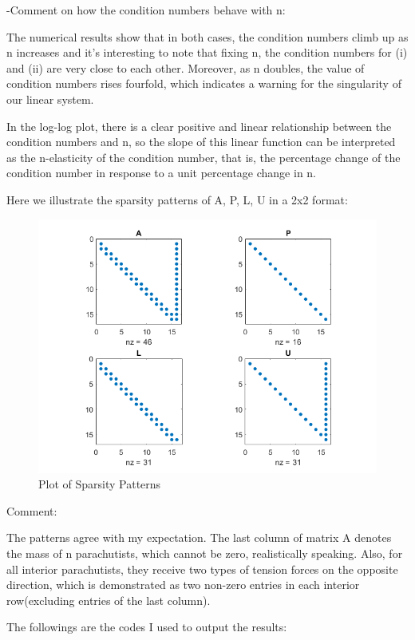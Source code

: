 \documentclass[12pt]{article}
\begin{document}
-Comment on how the condition numbers behave with n:

The numerical results show that in both cases, the condition numbers climb up as n increases and it's interesting to note that fixing n, the condition numbers for (i) and (ii) are very close to each other. Moreover, as n doubles, the value of condition numbers rises fourfold, which indicates a warning for the singularity of our linear system.

In the log-log plot, there is a clear positive and linear relationship between the condition numbers and n, so the slope of this linear function can be interpreted as the n-elasticity of the condition number, that is, the percentage change of the condition number in response to a unit percentage change in n.

Here we illustrate the sparsity patterns of A, P, L, U in a 2x2 format:

\begin{figure}[H]
\includegraphics[scale=0.8]{sparsity_pattern.png}
\caption{Plot of Sparsity Patterns}
\end{figure}

Comment: 

The patterns agree with my expectation. The last column of matrix A denotes the mass of n parachutists, which cannot be zero, realistically speaking. Also, for all interior parachutists, they receive two types of tension forces on the opposite direction, which is demonstrated as two non-zero entries in each interior row(excluding entries of the last column).

The followings are the codes I used to output the results:
\end{document}
